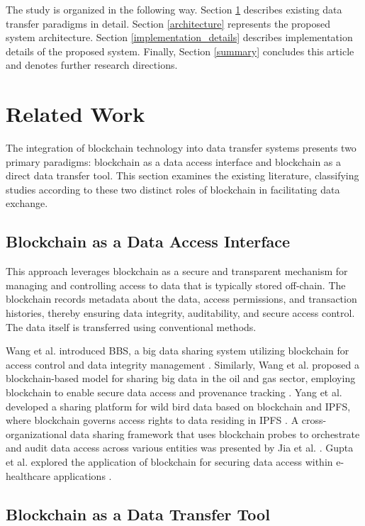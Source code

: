 \documentclass[10pt]{llncs}
\begin{document}
The study is organized in the following way.
Section \ref{related_work} describes existing data transfer paradigms in detail.
Section \ref{architecture} represents the proposed system architecture.
Section \ref{implementation_details} describes implementation details of the proposed system.
Finally, Section \ref{summary} concludes this article and denotes further research directions.

\section{Related Work} \label{related_work}

The integration of blockchain technology into data transfer systems presents two primary paradigms: blockchain as a data access interface and blockchain as a direct data transfer tool.
This section examines the existing literature, classifying studies according to these two distinct roles of blockchain in facilitating data exchange.

\subsection{Blockchain as a Data Access Interface}

This approach leverages blockchain as a secure and transparent mechanism for managing and controlling access to data that is typically stored off-chain.
The blockchain records metadata about the data, access permissions, and transaction histories, thereby ensuring data integrity, auditability, and secure access control.
The data itself is transferred using conventional methods.

Wang et al. introduced BBS, a big data sharing system utilizing blockchain for access control and data integrity management \cite{Wang2024}.
Similarly, Wang et al. proposed a blockchain-based model for sharing big data in the oil and gas sector, employing blockchain to enable secure data access and provenance tracking \cite{WangYY2021}.
Yang et al. developed a sharing platform for wild bird data based on blockchain and IPFS, where blockchain governs access rights to data residing in IPFS \cite{Yang2022}.
A cross-organizational data sharing framework that uses blockchain probes to orchestrate and audit data access across various entities was presented by Jia et al. \cite{Jia2023}.
Gupta et al. explored the application of blockchain for securing data access within e-healthcare applications \cite{Gupta2022}.
\subsection{Blockchain as a Data Transfer Tool}
\end{document}

